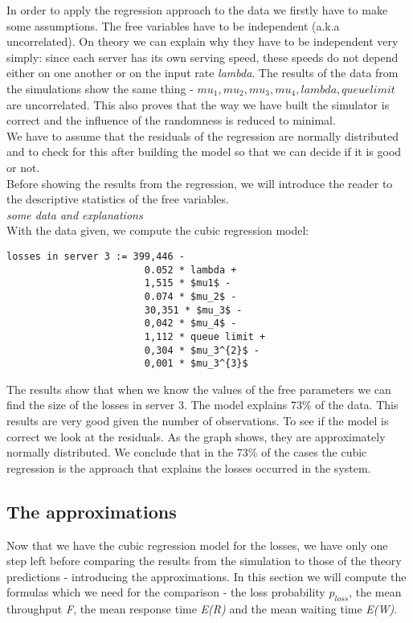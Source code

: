 \documentclass[12pt]{article}
\theoremstyle{plain}
\begin{document}
In order to apply the regression approach to the data we firstly have to make some
assumptions. The free variables have to be independent (a.k.a uncorrelated). On
theory we can explain why they have to be independent very simply: since each
server has its own serving speed, these speeds do not depend either on one another
or on the input rate \emph{lambda}. The results of the data from the simulations show
the same thing - $mu_1, mu_2, mu_3, mu_4, lambda, queue limit$ are uncorrelated.
This also proves that the way we have built the simulator is correct and the
influence of the randomness is reduced to minimal.\\
We have to assume that the residuals of the regression are normally distributed
and to check for this after building the model so that we can decide if it is good
or not.\\
Before showing the results from the regression, we will introduce the reader to
the descriptive statistics of the free variables.\\
\emph{some data and explanations}\\
With the data given, we compute the cubic regression model:\\

\begin{lstlisting}[frame=single]
  losses in server 3 := 399,446 -
                        0.052 * lambda +
                        1,515 * $mu1$ -
                        0.074 * $mu_2$ -
                        30,351 * $mu_3$ -
                        0,042 * $mu_4$ -
                        1,112 * queue limit +
                        0,304 * $mu_3^{2}$ -
                        0,001 * $mu_3^{3}$
\end{lstlisting}

The results show that when we know the values of the free parameters we can find
the size of the losses in server 3. The model explains 73\% of the data. This
results are very good given the number of observations. To see if the model is
correct we look at the residuals. As the graph shows, they are approximately
normally distributed. We conclude that in the 73\% of the cases the cubic regression
is the approach that explains the losses occurred in the system.

\subsection*{The approximations}

Now that we have the cubic regression model for the losses, we have only one step
left before comparing the results from the simulation to those of the theory 
predictions - introducing the approximations. In this section we will compute the
formulas which we need for the comparison - the loss probability $p_{loss}$, the mean
throughput \emph{F}, the mean response time \emph{E(R)} and the mean waiting time
\emph{E(W)}.
\end{document}
